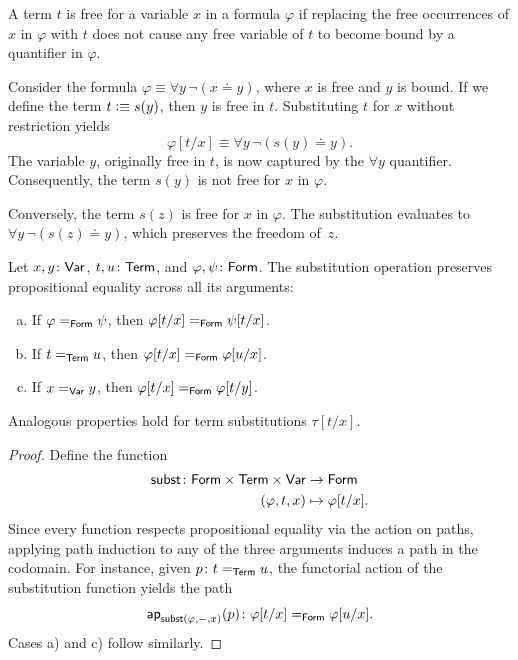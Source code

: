 \begin{rem}
    A term $t$ is free for a variable $x$ in a formula $\varphi$ if replacing the free occurrences of $x$ in $\varphi$ with $t$ does not cause any free variable of $t$ to become bound by a quantifier in $\varphi$.
    
    Consider the formula $\varphi \equiv \forall y\,\neg(x \doteq y)$, where $x$ is free and $y$ is bound. If we define the term $t \mathrel{\vcentcolon}\equiv s(y)$, then $y$ is free in $t$. Substituting $t$ for $x$ without restriction yields
    \[
        \varphi[t/x] \equiv \forall y\,\neg(s(y) \doteq y).
    \]
    The variable $y$, originally free in $t$, is now captured by the $\forall y$ quantifier. Consequently, the term $s(y)$ is not free for $x$ in $\varphi$.
    
    Conversely, the term $s(z)$ is free for $x$ in $\varphi$. The substitution evaluates to $\forall y\,\neg(s(z) \doteq y)$, which preserves the freedom of~$z$.
\end{rem}

\begin{lem}\label{lem:subst-equality}
    Let\/ $x,y\colon\fun{Var}$, $t,u\colon\fun{Term}$, and\/ $\varphi,\psi\colon\fun{Form}$. The substitution operation preserves propositional equality across all its arguments:
    \begin{enumerate}[a),font=\upshape]
        \item If\/ $\varphi\mathrel{=_{\mathsf{Form}}}\psi$, then\/ $\varphi[t/x]\mathrel{=_{\mathsf{Form}}}\psi[t/x]$.
        \item If\/ $t\mathrel{=_{\mathsf{Term}}}u$, then\/ $\varphi[t/x]\mathrel{=_{\mathsf{Form}}}\varphi[u/x]$.
        \item If\/ $x\mathrel{=_{\mathsf{Var}}}y$, then\/ $\varphi[t/x]\mathrel{=_{\mathsf{Form}}}\varphi[t/y]$.
    \end{enumerate}
    Analogous properties hold for term substitutions\/ $\tau[t/x]$.
\end{lem}

\begin{proof}
    Define the function 
    \begin{align*}
        \fun{subst}\colon
            \fun{Form}\times\fun{Term}\times\fun{Var}
                &\to\fun{Form}\\
            (\varphi,t,x)&\mapsto\varphi[t/x].
    \end{align*}
    Since every function respects propositional equality via the action on paths, applying path induction to any of the three arguments induces a path in the codomain. For instance, given $p\colon t\eq{\fun{Term}}u$, the functorial action of the substitution function yields the path
    \[
        \fun{ap}_{\fun{subst}(\varphi,\dummy,x)}(p)
            \colon\varphi[t/x]\eq{\fun{Form}}\varphi[u/x].
    \]
    Cases a) and c) follow similarly. 
\end{proof}

